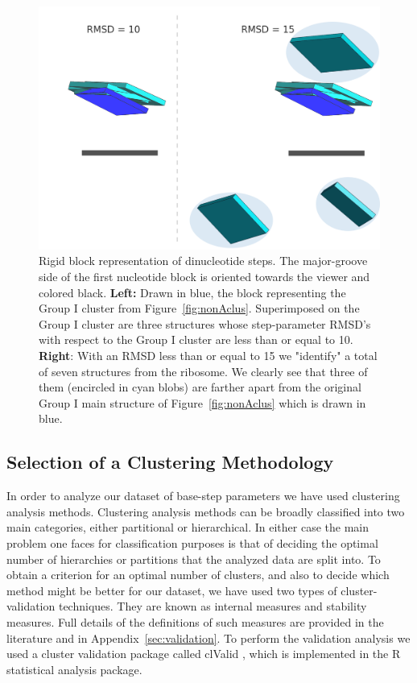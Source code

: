 \begin{figure}[htp]
 \centering
\includegraphics[angle=0, scale=1.5]{Chapter2/G1at10_15b.png}
\caption{Rigid  block   representation  of  dinucleotide   steps.  The
  major-groove side of the  first nucleotide block is oriented towards
  the  viewer and  colored black.  \textbf{Left:} Drawn  in  blue, the
  block     representing     the      Group     I     cluster     from
  Figure~\ref{fig:nonAclus}. Superimposed  on the Group  I cluster are
  three  structures whose  step-parameter RMSD's  with respect  to the
  Group I cluster  are less than or equal  to 10. \textbf{Right}: With
  an RMSD  less than  or equal to  15 we  "identify" a total  of seven
  structures  from the  ribosome. We  clearly see  that three  of them
  (encircled in cyan blobs) are  farther apart from the original Group
  I  main structure  of  Figure~\ref{fig:nonAclus} which  is drawn  in
  blue.}
 \label{fig:superimpose}
\end{figure}

\subsection{Selection of a Clustering Methodology} 
In order to  analyze our dataset of base-step  parameters we have used
clustering  analysis  methods.   Clustering  analysis methods  can  be
broadly  classified into  two main  categories, either  partitional or
hierarchical.   In  either  case   the  main  problem  one  faces  for
classification  purposes is  that of  deciding the  optimal  number of
hierarchies or partitions  that the analyzed data are  split into.  To
obtain  a criterion for  an optimal  number of  clusters, and  also to
decide which method might be better  for our dataset, we have used two
types of  cluster-validation techniques.   They are known  as internal
measures and  stability measures.  Full details of  the definitions of
such  measures   are  provided  in   the  literature  \cite{handl2005,
  brock2008}  and in  Appendix~\ref{sec:validation}.   To perform  the
validation  analysis  we  used  a cluster  validation  package  called
clValid \cite{brock2008},  which is implemented in  the R \cite{rcite}
statistical analysis package.

